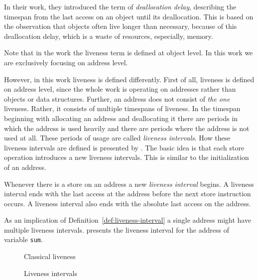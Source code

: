 \documentclass[onecolumn, openright, master, english, signatures]{dbrgrptt}
\begin{document}
In their work, they introduced the term of \emph{deallocation delay}, describing the timespan from the last access on an object until its deallocation.
This is based on the observation that objects often live longer than necessary, because of this deallocation delay, which is a waste of resources, especially, memory.

\begin{remark}
Note that in the work \cite{aigner2013acdc} the liveness term is defined at object level. In this work we are exclusively focusing on address level.
\end{remark}

However, in this work liveness is defined differently.
First of all, liveness is defined on address level, since the whole work is operating on addresses rather than objects or data structures.
Further, an address does not consist of \emph{the one} liveness.
Rather, it consists of multiple timespans of liveness.
In the timespan beginning with allocating an address and deallocating it there are periods in which the address is used heavily and there are periods where the address is not used at all.
These periods of usage are called \emph{liveness intervals}.
How these liveness intervals are defined is presented by .
The basic idea is that each store operation introduces a new liveness intervals.
This is similar to the initialization of an address.

\begin{definition}\label{def:liveness-interval}
Whenever there is a store on an address a new \emph{liveness interval} begins. A liveness interval ends with the last access at the address before the next store instruction occurs. A liveness interval also ends with the absolute last access on the address.
\end{definition}

\begin{remark}
As an implication of Definition~\ref{def:liveness-interval} a single address might have multiple liveness intervals.
 presents the liveness interval for the address of variable \texttt{sum}.
\end{remark}

\begin{figure}[!ht]
  \centering
  
  \caption{Classical liveness}
  \label{fig:liveness-classical}
\end{figure}

\begin{figure}[!ht]
  \centering
  
  \caption{Liveness intervals}
  \label{fig:liveness-intervals}
\end{figure}
\end{document}

